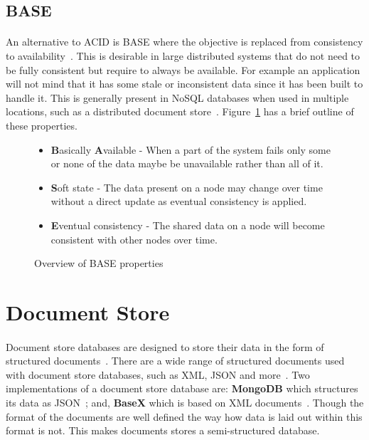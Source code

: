 \documentclass{CRPITStyle}
\renewcommand{\cite}{\citep}
\begin{document}
\subsection{BASE}

\paragraph{}
An alternative to ACID is BASE where the objective is replaced from consistency
to availability~\cite{nosql_survey}.
This is desirable in large distributed systems that do not need to be
fully consistent but require to always be available.
For example an application will not mind that it has some stale or
inconsistent data since it has been built to handle it.
This is generally present in NoSQL databases when used in multiple
locations, such as a distributed document store~\cite{base}.
Figure~\ref{l:base} has a brief outline of these properties.

\begin{figure}
\begin{itemize}
    \item \textbf{B}asically \textbf{A}vailable - When a part of the system
        fails only some or none of the data maybe be unavailable rather than
        all of it.
    \item \textbf{S}oft state - The data present on a node may change over time
        without a direct update as eventual consistency is applied.
    \item \textbf{E}ventual consistency - The shared data on a node will become consistent with
        other nodes over time.
\end{itemize}
\caption{Overview of BASE properties~\cite{base}}\label{l:base}
\end{figure}



\section{Document Store}

\paragraph{}
Document store databases are designed to store their data in the form of
structured documents~\cite{base,nosql_survey}.
There are a wide range of structured documents used with document store
databases, such as XML, JSON and more~\cite{base,compare_nosql}.
Two implementations of a document store database are: \textbf{MongoDB} which
structures its data as JSON~\cite{base}; and, \textbf{BaseX} which is based on XML
documents~\cite{basex}.
Though the format of the documents are well defined the
way how data is laid out within this format is not.
This makes documents stores a semi-structured database.
\end{document}

